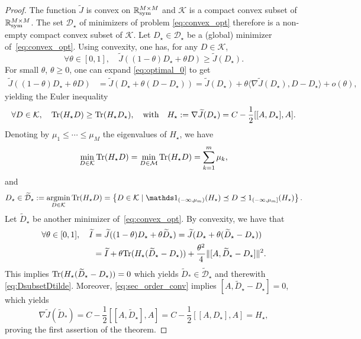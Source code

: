 \documentclass{article}
\def\R{\mathbb R}
\newcommand{\tr}{{\rm Tr}}
\newcommand{\1}{{\mathds 1}}
\begin{document}
\begin{proof}
    The function $\widetilde J$ is convex on $\R^{M \times M}_{\rm sym}$ and $\mathcal K$ is a compact convex subset of $\R^{M \times M}_{\rm sym}$. The set $\mathcal{D}_\star$  of minimizers of problem \eqref{eq:convex_opt} therefore is a non-empty compact convex subset of $\mathcal{K}$. Let $D_\star \in \mathcal{D}_\star$ be a (global) minimizer of~\eqref{eq:convex_opt}. Using convexity, one has, for any $D \in \mathcal{K}$,
\begin{equation}\label{eq:optimal_0}
\forall \theta \in [0,1], \quad \widetilde J((1-\theta) D_\star + \theta D) \geq \widetilde J(D_\star). \end{equation}
For small $\theta$, $\theta \geq 0$, one can expand \eqref{eq:optimal_0} to get
\begin{align*}
    \widetilde J((1-\theta) D_\star + \theta D)& = \widetilde J( D_\star + \theta (D-D_\star))= \widetilde J( D_\star) + \theta \langle\nabla \widetilde J( D_\star) , D-D_\star\rangle + o(\theta),
\end{align*}
yielding the Euler inequality
\begin{equation}\label{eq:euler_lagrange}
\forall D \in \mathcal{K}, \quad \tr(H_\star D) \ge  \tr( H_\star D_\star), \quad \mbox{with} \quad H_\star := \nabla \widetilde J( D_\star)=C- \frac 12[[A,D_\star],A].
\end{equation}
Denoting by  $\mu_1 \le \cdots \le \mu_M$ the eigenvalues of $H_\star$, we have 
$$
    \min_{D \in \mathcal{K} }\tr(H_\star D) = \min_{D \in \mathcal{M}}\tr(H_\star D) = \sum_{k = 1}^{m} \mu_{k},
$$
and
$$
D_\star \in \widetilde {\mathcal D}_\star:= \mathop{\rm argmin}_{D \in \mathcal K}\tr(H_\star D)=\left\{ D \in \mathcal K \; | \;  \mathds 1_{(-\infty,\mu_m)}(H_\star) \preceq D \preceq 1_{(-\infty,\mu_m]}(H_\star) \right\}.
$$
Let $\widetilde D_\star$ be another minimizer of~\eqref{eq:convex_opt}. By convexity, we have that
\begin{align}
\forall \theta \in [0,1], \quad \widetilde I &= \widetilde J((1-\theta) D_\star + \theta \widetilde D_\star)  = \widetilde J(D_\star +\theta(\widetilde D_\star- D_\star)) \nonumber \\
&= \widetilde I + \theta \tr(H_\star ( \widetilde D_\star-D_\star)) +\frac{\theta^2}4 \lVert [A,\widetilde D_{\star} - D_\star] \rVert^2. \label{eq:sec_order_conv}
\end{align}
This implies $\tr(H_\star ( \widetilde D_\star-D_\star))=0$ which yields $\widetilde D_* \in \widetilde {\mathcal D}_\star$ and therewith \eqref{eq:DsubsetDtilde}. Moreover, \eqref{eq:sec_order_conv} implies $[A,\widetilde D_{\star} - D_\star]=0$, which yields
$$
\nabla \widetilde J(\widetilde D_*) = C-  \frac 12[[A,\widetilde D_\star],A] =  C-  \frac 12[[A,D_\star],A] = H_\star,
$$
proving the first assertion of the theorem.


\end{proof}
\end{document}
